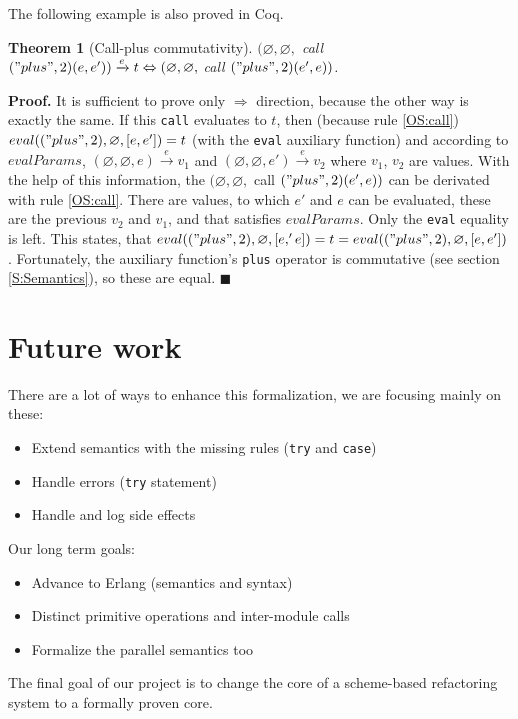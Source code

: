 \documentclass[12pt]{article}
\newtheorem{thm}{Theorem}[section]
\theoremstyle{definition}
\newcommand{\ose}{\xrightarrow{e}}
\numberwithin{equation}{section}
\begin{document}
The following example is also proved in Coq.

\begin{thm}[Call-plus commutativity]
	$(\varnothing, \varnothing, $ call $ ("plus", 2)(e, e')) \ose t \Leftrightarrow (\varnothing, \varnothing, $ call $ ("plus", 2)(e', e))$.
\end{thm}
\noindent
{\bf Proof.} It is sufficient to prove only $\Rightarrow$ direction, because the other way is exactly the same. If this \verb|call| evaluates to $t$, then (because rule \ref{OS:call}) $eval(("plus", 2), \varnothing, [e, e']) = t$ (with the \verb|eval| auxiliary function) and according to $evalParams$, $(\varnothing, \varnothing, e) \ose v_1$ and $(\varnothing, \varnothing, e') \ose v_2$ where $v_1$, $v_2$ are values. With the help of this information, the $(\varnothing, \varnothing, $ call $ ("plus", 2)(e', e))$ can be derivated with rule \ref{OS:call}. There are values, to which $e'$ and $e$ can be evaluated, these are the previous $v_2$ and $v_1$, and that satisfies $evalParams$. Only the \verb|eval| equality is left. This states, that $eval(("plus", 2), \varnothing, [e,' e]) = t = eval(("plus", 2), \varnothing, [e, e'])$. Fortunately, the auxiliary function's \verb|plus| operator is commutative (see section \ref{S:Semantics}), so these are equal. $\blacksquare$


\section{Future work}

There are a lot of ways to enhance this formalization, we are focusing mainly on these:
\begin{itemize}
	\item Extend semantics with the missing rules (\verb|try| and \verb|case|)
	\item Handle errors (\verb|try| statement)
	\item Handle and log side effects
\end{itemize}

\noindent Our long term goals:
\begin{itemize}
	\item Advance to Erlang (semantics and syntax)
	\item Distinct primitive operations and inter-module calls
	\item Formalize the parallel semantics too
\end{itemize}

The final goal of our project is to change the core of a scheme-based refactoring system to a formally proven core.
\end{document}
